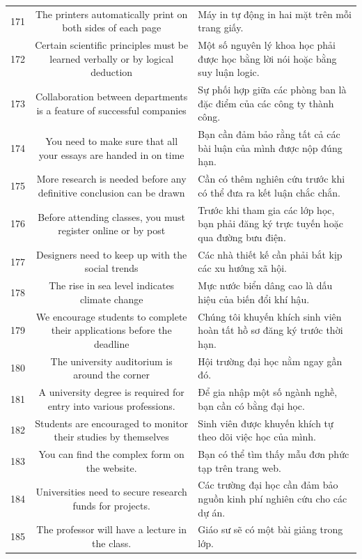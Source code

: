\documentclass[11pt,a4paper]{article}
\begin{document}
\begin{longtable}{N S M}
171 & The printers automatically print on both sides of each page & Máy in tự động in hai mặt trên mỗi trang giấy. \\
172 & Certain scientific principles must be learned verbally or by logical deduction & Một số nguyên lý khoa học phải được học bằng lời nói hoặc bằng suy luận logic. \\
173 & Collaboration between departments is a feature of successful companies & Sự phối hợp giữa các phòng ban là đặc điểm của các công ty thành công. \\
174 & You need to make sure that all your essays are handed in on time & Bạn cần đảm bảo rằng tất cả các bài luận của mình được nộp đúng hạn. \\
175 & More research is needed before any definitive conclusion can be drawn & Cần có thêm nghiên cứu trước khi có thể đưa ra kết luận chắc chắn. \\
176 & Before attending classes, you must register online or by post & Trước khi tham gia các lớp học, bạn phải đăng ký trực tuyến hoặc qua đường bưu điện. \\
177 & Designers need to keep up with the social trends & Các nhà thiết kế cần phải bắt kịp các xu hướng xã hội. \\
178 & The rise in sea level indicates climate change & Mực nước biển dâng cao là dấu hiệu của biến đổi khí hậu. \\
179 & We encourage students to complete their applications before the deadline & Chúng tôi khuyến khích sinh viên hoàn tất hồ sơ đăng ký trước thời hạn. \\
180 & The university auditorium is around the corner & Hội trường đại học nằm ngay gần đó. \\
181 & A university degree is required for entry into various professions. & Để gia nhập một số ngành nghề, bạn cần có bằng đại học. \\
182 & Students are encouraged to monitor their studies by themselves & Sinh viên được khuyến khích tự theo dõi việc học của mình. \\
183 & You can find the complex form on the website. & Bạn có thể tìm thấy mẫu đơn phức tạp trên trang web. \\
184 & Universities need to secure research funds for projects. & Các trường đại học cần đảm bảo nguồn kinh phí nghiên cứu cho các dự án. \\
185 & The professor will have a lecture in the class. & Giáo sư sẽ có một bài giảng trong lớp. \\

\end{longtable}
\end{document}
